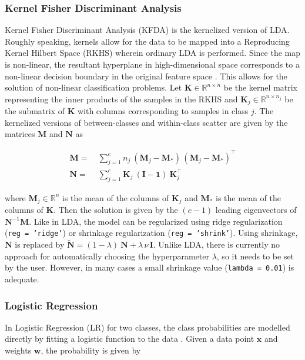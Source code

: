 \documentclass[utf8]{frontiersSCNS} %
\newcommand{\w}{\mathbf{w}}
\newcommand{\x}{\mathbf{x}}
\newcommand{\I}{\mathbf{I}}
\newcommand{\K}{\mathbf{K}}
\newcommand{\M}{\mathbf{M}}
\newcommand{\R}{\mathbb{R}}
\newcommand{\ttt}[1]{\texttt{#1}}
\begin{document}
\subsubsection{Kernel Fisher Discriminant Analysis}

Kernel Fisher Discriminant Analysis (KFDA) is the kernelized version of LDA. Roughly speaking, kernels allow for the data to be mapped into a Reproducing Kernel Hilbert Space (RKHS) wherein ordinary LDA is performed. Since the map is non-linear, the resultant hyperplane in high-dimensional space corresponds to a non-linear decision boundary in the original feature space \citep{Mika1999FisherKernels}. This allows for the solution of non-linear classification problems. Let $\K\in\R^{n\times n}$ be the kernel matrix representing the inner products of the samples in the RKHS and $\K_j\in\R^{n \times n_j}$ be the submatrix of $\K$ with columns corresponding to samples in class $j$. The kernelized versions of between-classes and within-class scatter are given by the matrices $\M$ and $\mathbf{N}$ as


\begin{equation}
\label{eq:kernelFDA}
\begin{alignedat}{2}
\M =\ &  \sum_{j=1}^c n_j\ (\M_j - \M_*)\,(\M_j-\M_*)^\top\\
\mathbf{N} =\ & \sum_{j=1}^c \K_j\ (\mathbf{I} - \mathbf{1})\  \K_j^\top
\end{alignedat}
\end{equation}

where $\M_j\in\R^n$ is the mean of the columns of $\K_j$ and $\M_*$ is the mean of the columns of $\K$. Then the solution is given by the $(c-1)$ leading eigenvectors of $\mathbf{N}^{-1} \mathbf{M}$. 
Like in LDA, the model can be regularized using ridge regularization (\ttt{reg = 'ridge'}) or shrinkage regularization (\ttt{reg = 'shrink'}). Using shrinkage, $\mathbf{N}$ is replaced by $\widetilde{\mathbf{N}} = (1-\lambda)\ \mathbf{N} + \lambda\,\nu\,\I$. Unlike LDA, there is currently no approach for automatically choosing the hyperparameter $\lambda$, so it needs to be set by the user. However, in many cases a small shrinkage value (\ttt{lambda = 0.01}) is adequate.

\subsubsection{Logistic Regression}

In Logistic Regression (LR) for two classes, the class probabilities are modelled directly by fitting a logistic function to the data \citep{Hastie2009}. Given a data point $\x$ and weights $\w$, the probability is given by
\end{document}

